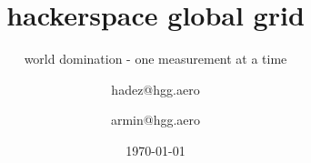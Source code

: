 




\usepackage{url}
%

\usepackage{listings}
  
\usepackage[utf8]{inputenc}
\usepackage[T1]{fontenc}
\usepackage{lmodern}
\usepackage[ngerman]{babel}

\usepackage{amsmath}

\usepackage{array}
\usepackage{longtable}
\usepackage{graphicx}
\graphicspath{{./pic/}}

\newcommand{\shack}{\includegraphics<.->[height=1em]{shack_brightbg}}
\newcommand{\hgg}{\includegraphics<.->[height=1em]{hgg_logo_rgb_pos}}


\date{\today}

 
\title{hackerspace global grid} 
\subtitle{world domination - one measurement at a time}
\author[hdz, reloc0]{hadez@hgg.aero \and armin@hgg.aero}

\subject{Vortragsreihe des CCCS}

\titlegraphic{}


\AtBeginSection
{
  \begin{frame}
  \end{frame}
}

\AtBeginSubsection
{
  \begin{frame}
  \end{frame}
}






